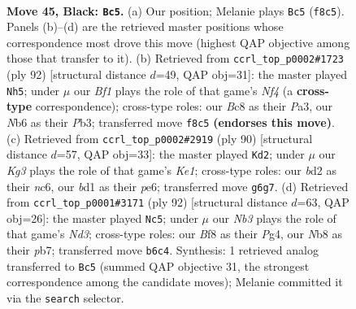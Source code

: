 \documentclass[11pt]{article}
\begin{document}
\clearpage

\begin{figure}[p]\centering
\begin{subfigure}{0.46\textwidth}\centering
\resizebox{\linewidth}{!}{%
\newchessgame
\chessboard[
  setfen={1nb2b2/1p6/1n4k1/pN1p2p1/7p/PP2PK1P/3BP3/3B4 b - - 3 45},
  showmover=false,
  pgfstyle=straightmove, color=movearrow, markmove={f8-c5}
]}
\caption{}
\end{subfigure}\hfill
\begin{subfigure}{0.46\textwidth}\centering
\resizebox{\linewidth}{!}{%
\newchessgame
\chessboard[
  setfen={8/4k1p1/p1bn1pP1/1p1p1p2/3P1N2/PP1BPK2/8/8 w - - 5 47},
  showmover=false,
  pgfstyle=straightmove, color=movearrow, markmove={f4-h5}
]}
\caption{}
\end{subfigure}
\\[4pt]
\begin{subfigure}{0.46\textwidth}\centering
\resizebox{\linewidth}{!}{%
\newchessgame
\chessboard[
  setfen={2b5/4k3/p1n1pp2/P2p2p1/3P4/1N2P1P1/4BP2/4K3 w - - 4 46},
  showmover=false,
  pgfstyle=straightmove, color=movearrow, markmove={e1-d2}
]}
\caption{}
\end{subfigure}\hfill
\begin{subfigure}{0.46\textwidth}\centering
\resizebox{\linewidth}{!}{%
\newchessgame
\chessboard[
  setfen={4b3/1p4k1/3b1p2/1p1p2p1/1P1P2Pp/3N1P1P/1P3B2/5K2 w - - 0 47},
  showmover=false,
  pgfstyle=straightmove, color=movearrow, markmove={d3-c5}
]}
\caption{}
\end{subfigure}
\caption{\textbf{Move 45, Black: \texttt{Bc5}.} (a) Our position; Melanie plays \texttt{Bc5} (\texttt{f8c5}). Panels (b)--(d) are the retrieved master positions whose correspondence most drove this move (highest QAP objective among those that transfer to it). (b) Retrieved from \texttt{ccrl\_top\_p0002\#1723} (ply 92) [structural distance $d$=49, QAP obj=31]: the master played \texttt{Nh5}; under $\mu$ our \emph{Bf1} plays the role of that game's \emph{Nf4} (a \textbf{cross-type} correspondence); cross-type roles: our \emph{B}c8 as their \emph{P}a3, our \emph{N}b6 as their \emph{P}b3; transferred move \texttt{f8c5} \textbf{(endorses this move)}. (c) Retrieved from \texttt{ccrl\_top\_p0002\#2919} (ply 90) [structural distance $d$=57, QAP obj=33]: the master played \texttt{Kd2}; under $\mu$ our \emph{Kg3} plays the role of that game's \emph{Ke1}; cross-type roles: our \emph{b}d2 as their \emph{n}c6, our \emph{b}d1 as their \emph{p}e6; transferred move \texttt{g6g7}. (d) Retrieved from \texttt{ccrl\_top\_p0001\#3171} (ply 92) [structural distance $d$=63, QAP obj=26]: the master played \texttt{Nc5}; under $\mu$ our \emph{Nb3} plays the role of that game's \emph{Nd3}; cross-type roles: our \emph{B}f8 as their \emph{P}g4, our \emph{N}b8 as their \emph{p}b7; transferred move \texttt{b6c4}. Synthesis: 1 retrieved analog transferred to \texttt{Bc5} (summed QAP objective 31, the strongest correspondence among the candidate moves); Melanie committed it via the \texttt{search} selector.}
\label{fig:thought-m89}
\end{figure}
\end{document}
